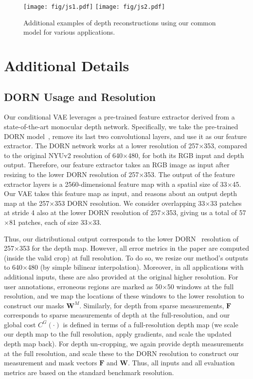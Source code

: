 \documentclass[10pt,twocolumn,letterpaper]{article}
\begin{document}
\begin{figure}[!h]
  \centering
  \texttt{[image: fig/js1.pdf]}
  \texttt{[image: fig/js2.pdf]} 
  \caption{Additional examples of depth reconstructions using our common model for various applications.}
  \label{fig:add}
\end{figure}

\section{Additional Details}

\subsection{DORN Usage and Resolution}

Our conditional VAE leverages a pre-trained feature extractor derived from a state-of-the-art monocular depth network. Specifically, we take the pre-trained DORN model~\cite{fu2018deep}, remove its last two convolutional layers, and use it as our feature extractor. The DORN network works at a lower resolution of 257$\times$353, compared to the original NYUv2 resolution of 640$\times$480, for both its RGB input and depth output. Therefore, our feature extractor takes an  RGB image as input after resizing to the lower DORN resolution of 257$\times$353. The output of the feature extractor layers is a 2560-dimensional feature map with a spatial size of 33$\times$45. Our VAE takes this feature map as input, and reasons about an output depth map at the 257$\times$353 DORN resolution. We consider overlapping 33$\times$33 patches at stride 4 also at the lower DORN resolution of 257$\times$353, giving us a total of 57$\times$81 patches, each of size 33$\times$33.

Thus, our distributional output corresponds to the lower DORN~\cite{fu2018deep} resolution of 257$\times$353 for the depth map. However, all error metrics in the paper are computed (inside the valid crop) at full resolution. To do so, we resize our method's outputs to 640$\times$480 (by simple bilinear interpolation). Moreover, in all applications with additional inputs, these are also provided at the original higher resolution. For user annotations, erroneous regions are marked as 50$\times$50 windows at the full resolution, and we map the locations of these windows to the lower resolution to construct our masks $\mathbf{W}^M$. Similarly, for depth from sparse measurements, $\mathbf{F}$ corresponds to sparse measurements of depth at the full-resolution, and our global cost $C^G(\cdot)$ is defined in terms of a full-resolution depth map (we scale our depth map to the full resolution, apply gradients, and scale the updated depth map back). For depth un-cropping, we again provide depth measurements at the full resolution, and scale these to the DORN resolution to construct our measurement and mask vectors $\mathbf{F}$ and $\mathbf{W}$. Thus, all inputs and all evaluation metrics are based on the standard benchmark resolution.
\end{document}
